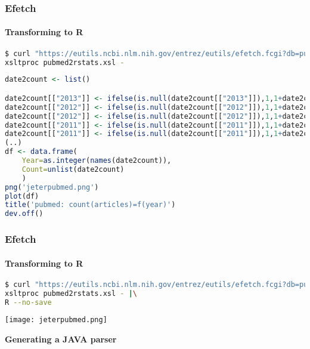 \documentclass{beamer}
\newcommand{\centeredtitle}[1]{
\begin{center}
    \Huge{\bf{#1}}
\end{center}
}
\newcommand{\hugeslide}[1]{
\begin{frame}
\centeredtitle{#1}
\end{frame}
}
\begin{document}
\begin{frame}[fragile]
\frametitle{Efetch}
\framesubtitle{Transforming to R}

\begin{lstlisting}[language=bash,basicstyle=\tiny,breaklines=true,escapechar=\!]
$ curl "https://eutils.ncbi.nlm.nih.gov/entrez/eutils/efetch.fcgi?db=pubmed&usehistory=true&WebEnv=NCID_1_52434791_130.14.22.215_9001_1375957034_1619786167&query_key=1&retmode=xml" |\
xsltproc pubmed2rstats.xsl -
\end{lstlisting}

\begin{lstlisting}[language=R,basicstyle=\tiny,breaklines=true,escapechar=\!]
date2count <- list()

date2count[["2013"]] <- ifelse(is.null(date2count[["2013"]]),1,1+date2count[["2013"]])
date2count[["2012"]] <- ifelse(is.null(date2count[["2012"]]),1,1+date2count[["2012"]])
date2count[["2012"]] <- ifelse(is.null(date2count[["2012"]]),1,1+date2count[["2012"]])
date2count[["2011"]] <- ifelse(is.null(date2count[["2011"]]),1,1+date2count[["2011"]])
date2count[["2011"]] <- ifelse(is.null(date2count[["2011"]]),1,1+date2count[["2011"]])
(..)
df <- data.frame(
	Year=as.integer(names(date2count)),
	Count=unlist(date2count)
	)
png('jeterpubmed.png')
plot(df)
title('pubmed: count(articles)=f(year)')
dev.off()
\end{lstlisting}

\end{frame}



\begin{frame}[fragile]
\frametitle{Efetch}
\framesubtitle{Transforming to R}

\begin{lstlisting}[language=bash,basicstyle=\tiny,breaklines=true,escapechar=\!]
$ curl "https://eutils.ncbi.nlm.nih.gov/entrez/eutils/efetch.fcgi?db=pubmed&usehistory=true&WebEnv=NCID_1_52434791_130.14.22.215_9001_1375957034_1619786167&query_key=1&retmode=xml" |\
xsltproc pubmed2rstats.xsl - |\
R --no-save
\end{lstlisting}

\begin{center}
\texttt{[image: jeterpubmed.png]}
\end{center}
\end{frame}

\hugeslide{Generating a JAVA parser}
\end{document}
